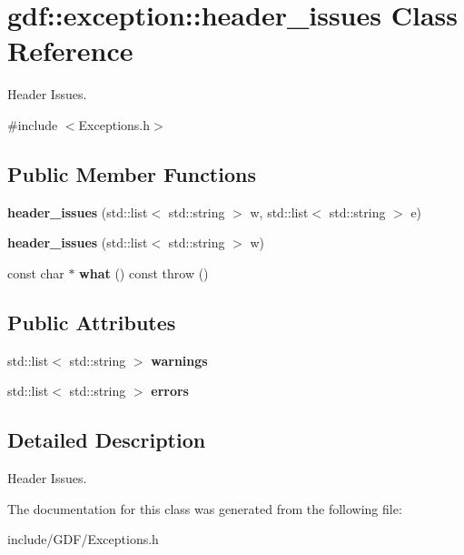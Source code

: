 \hypertarget{classgdf_1_1exception_1_1header__issues}{
\section{gdf::exception::header\_\-issues Class Reference}
\label{classgdf_1_1exception_1_1header__issues}
}


Header Issues.  




{\ttfamily \#include $<$Exceptions.h$>$}

\subsection*{Public Member Functions}
\begin{DoxyCompactItemize}
\item 
\hypertarget{classgdf_1_1exception_1_1header__issues_a51dfee5a7b2b1b3965d52946bf620544}{
{\bfseries header\_\-issues} (std::list$<$ std::string $>$ w, std::list$<$ std::string $>$ e)}
\label{classgdf_1_1exception_1_1header__issues_a51dfee5a7b2b1b3965d52946bf620544}

\item 
\hypertarget{classgdf_1_1exception_1_1header__issues_a0bb44f875a6abadbbb50665da7341064}{
{\bfseries header\_\-issues} (std::list$<$ std::string $>$ w)}
\label{classgdf_1_1exception_1_1header__issues_a0bb44f875a6abadbbb50665da7341064}

\item 
\hypertarget{classgdf_1_1exception_1_1header__issues_a4fd481b2e3024733ed3b10cc2a3dd03e}{
const char $\ast$ {\bfseries what} () const   throw ()}
\label{classgdf_1_1exception_1_1header__issues_a4fd481b2e3024733ed3b10cc2a3dd03e}

\end{DoxyCompactItemize}
\subsection*{Public Attributes}
\begin{DoxyCompactItemize}
\item 
\hypertarget{classgdf_1_1exception_1_1header__issues_acd440727fb354287dc7b813809761641}{
std::list$<$ std::string $>$ {\bfseries warnings}}
\label{classgdf_1_1exception_1_1header__issues_acd440727fb354287dc7b813809761641}

\item 
\hypertarget{classgdf_1_1exception_1_1header__issues_a967348333d33a93388b0cee0d94c6814}{
std::list$<$ std::string $>$ {\bfseries errors}}
\label{classgdf_1_1exception_1_1header__issues_a967348333d33a93388b0cee0d94c6814}

\end{DoxyCompactItemize}


\subsection{Detailed Description}
Header Issues. 

The documentation for this class was generated from the following file:\begin{DoxyCompactItemize}
\item 
include/GDF/Exceptions.h\end{DoxyCompactItemize}
